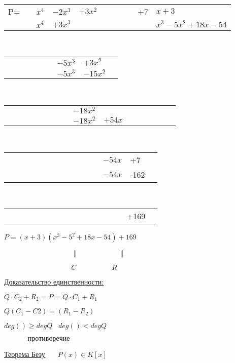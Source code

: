 \documentclass[a4paper,12pt]{article}
\theoremstyle{plain}
\begin{document}
	\begin{tabular}{rr@{}l@{}l@{}l@{}rrrl@{}l|l} P=&&$x^4$&$-2x^3$&$+3x^2$&&&&&+7&$x+3$\\ \cline{2--2}\cline{11--11} &&$x^4$&$+3x^3$&&&&&&&$x^3-5x^2+18x-54$\\ \cline{3--3} \cline{4--9}
	\end{tabular}\\
	\begin{tabular}{rrrrrr@{}l@{}l@{}l}
	&&&&&&$-5x^3$&$+3x^2$&\\
	\cline{6--6}
	&&&&&&$-5x^3$&$-15x^2$&\\ \cline{7--7}
	\cline{8--13}
	\end{tabular}\\
	\begin{tabular}{rrrrrrrr@{}l@{}l@{}l@{}l@{}l@{}l@{}l@{}l}
	&&&&&&&&$-18x^2$&&&&&&&\\ 
	\cline{8--8}
	&&&&&&&&$-18x^2$&$+54x$&&&&&&\\ \cline{9--10}
	\cline{10--15}
	\end{tabular}\\
	\begin{tabular}{rrrrrrrr@{}r@{}rl@{}l@{}l}
	&&&&&&&&$\;\;\;\;\;\;$&&$-54x$&+7&\\ \cline{10--10}
	&&&&&&&&$\;\;\;\;\;\;$&&$-54x$&-162&\\ \cline{11--17} \cline{12--17}
	\cline{13--21}
	\end{tabular}\\
	\begin{tabular}{rrrrrrrr@{}r@{}rl@{}l@{}l}
	&&&&&&&&$\;\;\;\;\;\;\;\;\;\;\;\;\;$&&&+169&\\ 
	\end{tabular}
	
$P=(x+3)(x^3-5^2+18x-54)+169$

$\;\;\;\;\;\;\;\;\;\;\;\;\;\;\;\;\;\;\;\;\;\;\;\;\;\;\;\;\;\;\;\;\;\;\parallel\;\;\;\;\;\;\;\;\;\;\;\;\;\;\;\;\;\;\;\;\parallel$

$\;\;\;\;\;\;\;\;\;\;\;\;\;\;\;\;\;\;\;\;\;\;\;\;\;\;\;\;\;\;\;\;\;\;C\;\;\;\;\;\;\;\;\;\;\;\;\;\;\;\;\;\;R$

\underline{Доказательство единственности:}

$Q \cdot C_{2}+R_{2}=P=Q \cdot C_{1} + R_{1}$

$Q(C_{1}-C{2})=(R_{1}-R_{2})$

$deg()\geqslant degQ \; \; \; deg()<degQ$

$\;\;\;\;\;\;\;\;\;\;\;\;противоречие$

\underline{Теорема Безу} $\;\;\;\;$ $P(x) \in K[x]$
\end{document}
